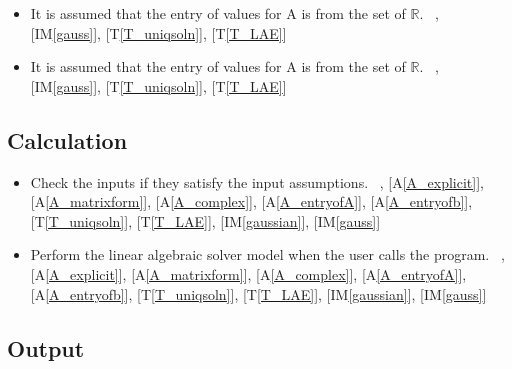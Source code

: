 \documentclass[12pt]{article}
\newcommand{\tref}[1]{T\ref{#1}}
\newcounter{assumpnum} %
\newcommand{\aref}[1]{A\ref{#1}}
\newcommand{\gsref}[1]{GS\ref{#1}}
\newcommand{\iref}[1]{IM\ref{#1}}
\newcounter{lcnum} %
\newcounter{calcnum} %
\begin{document}
{{\begin{itemize}
\item[A\refstepcounter{assumpnum}\theassumpnum \label{A_entryofA}:]
It is assumed that the entry of values for A is from the set of $\mathbb{R}$.
~\newline
 [\iref{gaussian}], [\iref{gauss}], [\tref{T_uniqsoln}], [\tref{T_LAE}]


\item[A\refstepcounter{assumpnum}\theassumpnum \label{A_entryofb}:]
It is assumed that the entry of values for A is from the set of $\mathbb{R}$.
~\newline
 [\iref{gaussian}], [\iref{gauss}], [\tref{T_uniqsoln}], [\tref{T_LAE}]



\end{itemize}

\subsection{Calculation} \label{sec_Calculation}    

\begin{itemize}
\item[C\refstepcounter{calcnum}\thecalcnum \label{C_inputs}:]
Check the inputs if they satisfy the input assumptions.
~\newline
[\gsref{G_solveforx}], [\aref{A_explicit}], [\aref{A_matrixform}],
[\aref{A_complex}], [\aref{A_entryofA}], [\aref{A_entryofb}],
[\tref{T_uniqsoln}], [\tref{T_LAE}], [\iref{gaussian}], [\iref{gauss}]

\item[C\refstepcounter{calcnum}\thecalcnum \label{C_progname}:]
Perform the linear algebraic solver model when the user calls the program.
~\newline
[\gsref{G_solveforx}], [\aref{A_explicit}], [\aref{A_matrixform}],
[\aref{A_complex}], [\aref{A_entryofA}], [\aref{A_entryofb}],
[\tref{T_uniqsoln}], [\tref{T_LAE}], [\iref{gaussian}], [\iref{gauss}]

\end{itemize}

  

\subsection{Output} \label{sec_Output}

}}
\end{document}
